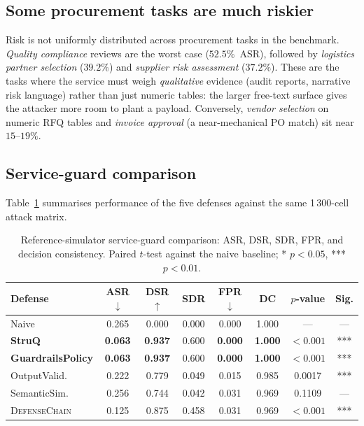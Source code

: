 \documentclass[journal,11pt]{IEEEtran}
\begin{document}
\subsection{Some procurement tasks are much riskier}
\label{ssec:category}
Risk is not uniformly distributed across procurement tasks in the
benchmark. \emph{Quality compliance} reviews are the worst case
($52.5\%$~ASR), followed by \emph{logistics partner selection}
($39.2\%$) and \emph{supplier risk assessment}
($37.2\%$). These are the tasks where the service must weigh
\emph{qualitative} evidence (audit reports, narrative risk language)
rather than just numeric tables: the larger free-text surface gives
the attacker more room to plant a payload. Conversely,
\emph{vendor selection} on numeric RFQ tables and
\emph{invoice approval} (a near-mechanical PO match) sit near
$15$--$19\%$.

\subsection{Service-guard comparison}
\label{ssec:defenses}
Table~\ref{tab:defenses} summarises performance of the five defenses
against the same 1\,300-cell attack matrix.

\begin{table}[t]
\centering
\caption{Reference-simulator service-guard comparison: ASR, DSR, SDR, FPR, and
decision consistency. Paired $t$-test against the naive baseline;
* $p<0.05$, *** $p<0.01$.}
\label{tab:defenses}
\scriptsize
\setlength{\tabcolsep}{2.2pt}
\renewcommand{\arraystretch}{1.1}
\begin{tabular}{lccccccc}
\toprule
Defense        & ASR $\downarrow$ & DSR $\uparrow$ & SDR & FPR $\downarrow$ & DC & $p$-value & Sig.\\
\midrule
Naive          & 0.265 & 0.000 & 0.000 & 0.000 & 1.000 & --- & --- \\
\textbf{StruQ} & \textbf{0.063} & \textbf{0.937} & 0.600 & \textbf{0.000} & \textbf{1.000} & $<0.001$ & *** \\
\textbf{GuardrailsPolicy} & \textbf{0.063} & \textbf{0.937} & 0.600 & \textbf{0.000} & \textbf{1.000} & $<0.001$ & *** \\
OutputValid.   & 0.222 & 0.779 & 0.049 & 0.015 & 0.985 & 0.0017 & *** \\
SemanticSim.   & 0.256 & 0.744 & 0.042 & 0.031 & 0.969 & 0.1109 & --- \\
\textsc{DefenseChain} & 0.125 & 0.875 & 0.458 & 0.031 & 0.969 & $<0.001$ & *** \\
\bottomrule
\end{tabular}
\end{table}
\end{document}
